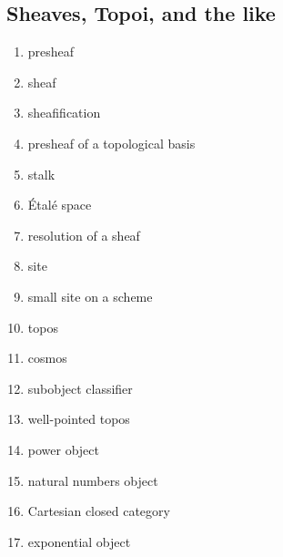 \documentclass[12pt]{article}
\begin{document}
\begin{multicols}{2}
\section{Sheaves, Topoi, and the like}
\begin{enumerate}
\item presheaf
\item sheaf 
\item sheafification
\item presheaf of a topological basis
\item stalk 
\item \'Etal\'e space
\item resolution of a sheaf
\item site
\item small site on a scheme
\item topos
\item cosmos
\item subobject classifier
\item well-pointed topos
\item power object
\item natural numbers object 
\item Cartesian closed category 
\item exponential object
\end{enumerate}

\end{multicols}
\end{document}
